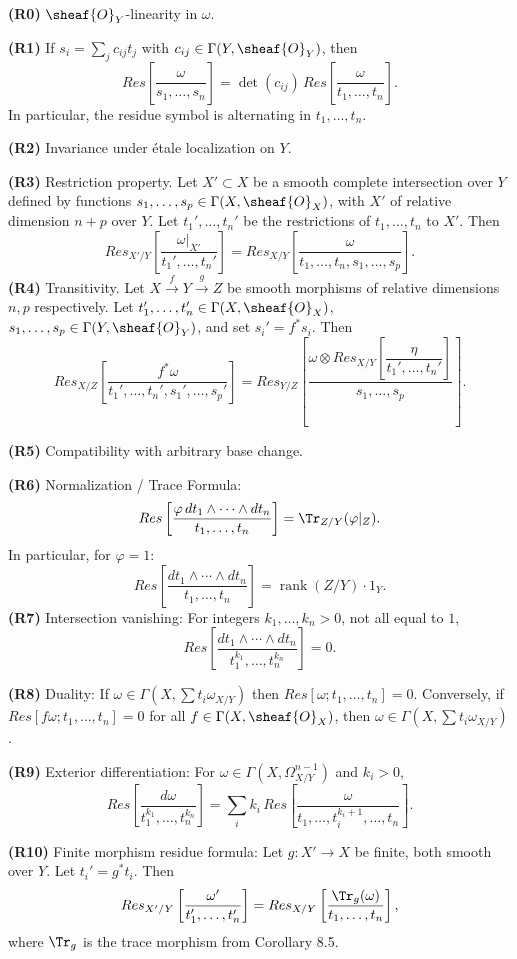 \noindent\textbf{(R0)} $\sheaf{O}_Y$-linearity in $\omega$.

\noindent\textbf{(R1)} If $s_i = \sum_j c_{ij}t_j$ with $c_{ij}\in\Gamma(Y,\sheaf{O}_Y)$, then
\[
Res\left[\dfrac{\omega}{s_1,\dots,s_n}\right]
= \det(c_{ij})\, Res\left[\dfrac{\omega}{t_1,\dots,t_n}\right].
\]
In particular, the residue symbol is alternating in $t_1,\dots,t_n$.

\noindent\textbf{(R2)} Invariance under étale localization on $Y$.

\noindent\textbf{(R3)} Restriction property. Let $X'\subset X$ be a smooth complete intersection over $Y$ defined by functions $s_1,\dots,s_p\in\Gamma(X,\sheaf{O}_X)$, with $X'$ of relative dimension $n+p$ over $Y$. Let $t_1',\dots,t_n'$ be the restrictions of $t_1,\dots,t_n$ to $X'$. Then
\[
Res_{X'/Y}\left[\dfrac{\omega|_{X'}}{t_1',\dots,t_n'}\right]
= Res_{X/Y}\left[\dfrac{\omega}{t_1,\dots,t_n,s_1,\dots,s_p}\right].
\]
\setcounter{page}{198}
\noindent\textbf{(R4)} Transitivity. Let $X\xrightarrow{f}Y\xrightarrow{g}Z$ be smooth morphisms of relative dimensions $n,p$ respectively. Let $t_1',\dots,t_n'\in\Gamma(X,\sheaf{O}_X)$, $s_1,\dots,s_p\in\Gamma(Y,\sheaf{O}_Y)$, and set $s_i' = f^*s_i$. Then
\[
Res_{X/Z}\left[\dfrac{f^*\omega}{t_1',\dots,t_n',s_1',\dots,s_p'}\right]
= Res_{Y/Z}\left[\dfrac{\omega \otimes Res_{X/Y}\left[\dfrac{\eta}{t_1',\dots,t_n'}\right]}{s_1,\dots,s_p}\right].
\]

\noindent\textbf{(R5)} Compatibility with arbitrary base change.

\noindent\textbf{(R6)} Normalization / Trace Formula:
\[
Res\left[\dfrac{\varphi\,dt_1\wedge\cdots\wedge dt_n}{t_1,\dots,t_n}\right]
= \Tr_{Z/Y}(\varphi|_Z).
\]
In particular, for $\varphi=1$:
\[
Res\left[\dfrac{dt_1\wedge\cdots\wedge dt_n}{t_1,\dots,t_n}\right]
= \operatorname{rank}(Z/Y)\cdot 1_Y.
\]
\setcounter{page}{199}
\noindent\textbf{(R7)} Intersection vanishing: For integers $k_1,\dots,k_n>0$, not all equal to $1$,
\[
Res\left[\dfrac{dt_1\wedge\cdots\wedge dt_n}{t_1^{k_1},\dots,t_n^{k_n}}\right] = 0.
\]

\noindent\textbf{(R8)} Duality: If $\omega\in\Gamma(X,\sum t_i\omega_{X/Y})$ then $Res[\omega;t_1,\dots,t_n]=0$. Conversely, if $Res[f\omega;t_1,\dots,t_n]=0$ for all $f\in\Gamma(X,\sheaf{O}_X)$, then $\omega\in\Gamma(X,\sum t_i\omega_{X/Y})$.

\noindent\textbf{(R9)} Exterior differentiation: For $\omega\in\Gamma(X,\Omega_{X/Y}^{n-1})$ and $k_i>0$,
\[
Res\left[\dfrac{d\omega}{t_1^{k_1},\dots,t_n^{k_n}}\right]
= \sum_i k_i\, Res\left[\dfrac{\omega}{t_1,\dots,t_i^{k_i+1},\dots,t_n}\right].
\]

\noindent\textbf{(R10)} Finite morphism residue formula: Let $g\colon X'\to X$ be finite, both smooth over $Y$. Let $t_i' = g^*t_i$. Then
\[
Res_{X'/Y}\left[\dfrac{\omega'}{t_1',\dots,t_n'}\right]
= Res_{X/Y}\left[\dfrac{\Tr_g(\omega)}{t_1,\dots,t_n}\right],
\]
where $\Tr_g$ is the trace morphism from Corollary 8.5.
